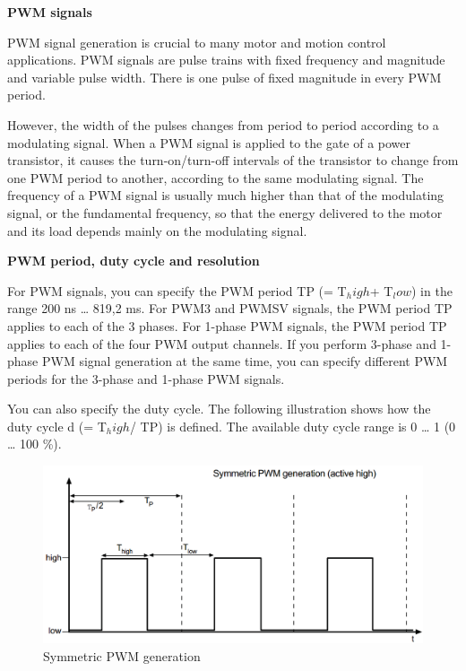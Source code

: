 \noindent \textbf{PWM signals}\par

PWM signal generation is crucial to many motor and motion control applications. PWM signals are pulse trains with fixed frequency and magnitude and variable pulse width. There is one pulse of fixed magnitude in every PWM period.

However, the width of the pulses changes from period to period according to a modulating signal. When a PWM signal is applied to the gate of a power transistor, it causes the turn-on/turn-off intervals of the transistor to change from one PWM period to another, according to the same modulating signal. The frequency of a PWM signal is usually much higher than that of the modulating signal, or the fundamental frequency, so that the energy delivered to the motor and its load depends mainly on the modulating signal.

\noindent \textbf{PWM period, duty cycle and resolution}\par

For PWM signals, you can specify the PWM period TP (= T$_high$+ T$_low$) in the range 200 ns … 819,2 ms. For PWM3 and PWMSV signals, the PWM period TP applies to each of the 3 phases. For 1-phase PWM signals, the PWM period TP applies to each of the four PWM output channels. If you perform 3-phase and 1-phase PWM signal generation at the same time, you can specify different PWM periods for the 3-phase and 1-phase PWM signals.

You can also specify the duty cycle. The following illustration shows how the duty cycle d (= T$_high$/ TP) is defined. The available duty cycle range is 0 … 1 (0 … 100 \%).

\begin{figure}[H]
    \centering
    \includegraphics[width=\textwidth]{Images/Symmetric PWM generation.png}
    \caption{Symmetric PWM generation}
    \label{Symmetric PWM generation}
\end{figure}

